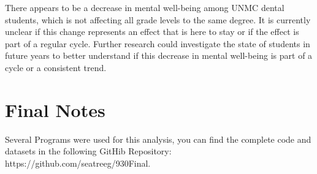 \documentclass{article}
\begin{document}
There appears to be a decrease in mental well-being among UNMC dental students, which is not affecting all grade levels to the same degree. It is currently unclear if this change represents an effect that is here to stay or if the effect is part of a regular cycle. Further research could investigate the state of students in future years to better understand if this decrease in mental well-being is part of a cycle or a consistent trend. 


\section{Final Notes}

Several Programs were used for this analysis, you can find the complete code and datasets in the following GitHib Repository: https://github.com/seatreeg/930Final. 

%

\end{document}
